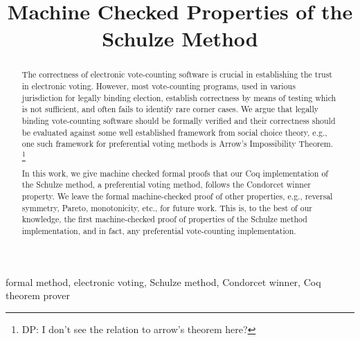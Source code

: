 \documentclass[compsoc,conference,a4paper,10pt,times]{IEEEtran}
\begin{document}
\title{Machine Checked Properties of the Schulze Method}

\author{
\and
{}
}

\maketitle

\begin{abstract}
The correctness of electronic vote-counting software is 
crucial in establishing the trust in electronic voting. 
However, most vote-counting programs, used in 
various jurisdiction for legally binding election, establish
correctness by means of testing which is not sufficient, and often
fails to identify rare corner cases.
We argue that legally binding vote-counting software 
should be formally verified and their correctness should be 
evaluated against some well established framework from social choice theory, 
e.g., one 
such framework for preferential voting methods is Arrow's Impossibility 
Theorem.
\footnote{DP: I don't see the relation to arrow's theorem here?}

In this work, 
we give machine checked formal proofs that our Coq implementation of the Schulze method,
a preferential voting method, 
follows the Condorcet winner property. We leave the formal machine-checked proof of 
other properties, e.g., reversal symmetry, Pareto, monotonicity, etc., for future work. 
This is, to the best of our knowledge, the first machine-checked proof of 
properties of the Schulze method implementation, and in fact, any preferential vote-counting 
implementation. 


\end{abstract}

\begin{IEEEkeywords}
formal method, electronic voting, Schulze method, 
Condorcet winner, Coq theorem prover
\end{IEEEkeywords}
\end{document}
